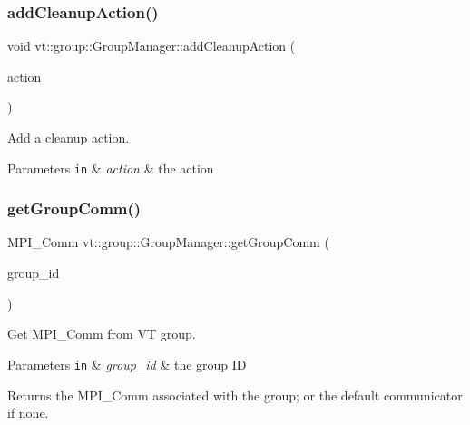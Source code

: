 \subsubsection{\texorpdfstring{add\+Cleanup\+Action()}{addCleanupAction()}}
{\footnotesize\ttfamily void vt\+::group\+::\+Group\+Manager\+::add\+Cleanup\+Action (\begin{DoxyParamCaption}\item[{\hyperlink{namespacevt_ae0a5a7b18cc99d7b732cb4d44f46b0f3}{Action\+Type}}]{action }\end{DoxyParamCaption})}



Add a cleanup action. 


\begin{DoxyParams}[1]{Parameters}
\mbox{\tt in}  & {\em action} & the action \\
\hline
\end{DoxyParams}
\mbox{\label{structvt_1_1group_1_1_group_manager_a15492a3874bd670c18336571e9768e8e}} 
\subsubsection{\texorpdfstring{get\+Group\+Comm()}{getGroupComm()}}
{\footnotesize\ttfamily M\+P\+I\+\_\+\+Comm vt\+::group\+::\+Group\+Manager\+::get\+Group\+Comm (\begin{DoxyParamCaption}\item[{\hyperlink{namespacevt_a27b5e4411c9b6140c49100e050e2f743}{Group\+Type} const}]{group\+\_\+id }\end{DoxyParamCaption})}



Get M\+P\+I\+\_\+\+Comm from VT group. 


\begin{DoxyParams}[1]{Parameters}
\mbox{\tt in}  & {\em group\+\_\+id} & the group ID\\
\hline
\end{DoxyParams}
\begin{DoxyReturn}{Returns}
the M\+P\+I\+\_\+\+Comm associated with the group; or the default communicator if none. 
\end{DoxyReturn}
\mbox{\label{structvt_1_1group_1_1_group_manager_a472e95d136ef71c14ac5b4c931ff79b9}} 
